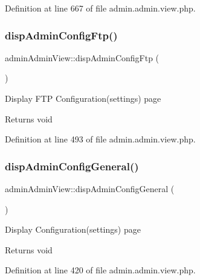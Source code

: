 Definition at line 667 of file admin.\+admin.\+view.\+php.

\hypertarget{classadminAdminView_ac1d596c739213d4fd3f127a6ca18c155}{}\label{classadminAdminView_ac1d596c739213d4fd3f127a6ca18c155} 
\subsubsection{\texorpdfstring{disp\+Admin\+Config\+Ftp()}{dispAdminConfigFtp()}}
{\footnotesize\ttfamily admin\+Admin\+View\+::disp\+Admin\+Config\+Ftp (\begin{DoxyParamCaption}{ }\end{DoxyParamCaption})}

Display F\+TP Configuration(settings) page \begin{DoxyReturn}{Returns}
void 
\end{DoxyReturn}


Definition at line 493 of file admin.\+admin.\+view.\+php.

\hypertarget{classadminAdminView_accaee16084bc6def9e841518d227be0e}{}\label{classadminAdminView_accaee16084bc6def9e841518d227be0e} 
\subsubsection{\texorpdfstring{disp\+Admin\+Config\+General()}{dispAdminConfigGeneral()}}
{\footnotesize\ttfamily admin\+Admin\+View\+::disp\+Admin\+Config\+General (\begin{DoxyParamCaption}{ }\end{DoxyParamCaption})}

Display Configuration(settings) page \begin{DoxyReturn}{Returns}
void 
\end{DoxyReturn}


Definition at line 420 of file admin.\+admin.\+view.\+php.

\hypertarget{classadminAdminView_aff78cea8f2e5632395dd4888742389b8}{}\label{classadminAdminView_aff78cea8f2e5632395dd4888742389b8} 
